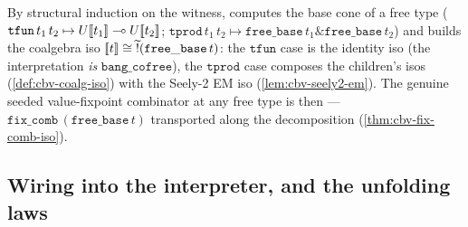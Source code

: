 \begin{definition}\label{def:cbv-fix-mr-comb}
\rocqok
{}\rocqok
{}\rocqok
{}
By structural induction on the
 witness,
 computes the base cone of a
free type ($\mathtt{tfun}\,t_1\,t_2 \mapsto U[\![ t_1 ]\!] \multimap
U[\![ t_2 ]\!]$; $\mathtt{tprod}\,t_1\,t_2 \mapsto
\mathtt{free\_base}\,t_1 \mathbin{\&} \mathtt{free\_base}\,t_2$) and
 builds the coalgebra iso
$[\![ t ]\!] \cong \widetilde{\mathord{!}}(\mathtt{free\_base}\,t)$: the
$\mathtt{tfun}$ case is the identity iso (the interpretation
\emph{is} $\mathtt{bang\_cofree}$), the $\mathtt{tprod}$ case
composes the children's isos (\autoref{def:cbv-coalg-iso}) with the
Seely-2 EM iso (\autoref{lem:cbv-seely2-em}). The genuine seeded
value-fixpoint combinator at any free type is then
 ---
$\mathtt{fix\_comb}\,(\mathtt{free\_base}\,t)$ transported along the
decomposition (\autoref{thm:cbv-fix-comb-iso}).
\end{definition}

\subsection{Wiring into the interpreter, and the unfolding laws}%
\label{ssec:cbv-fix-wiring}

